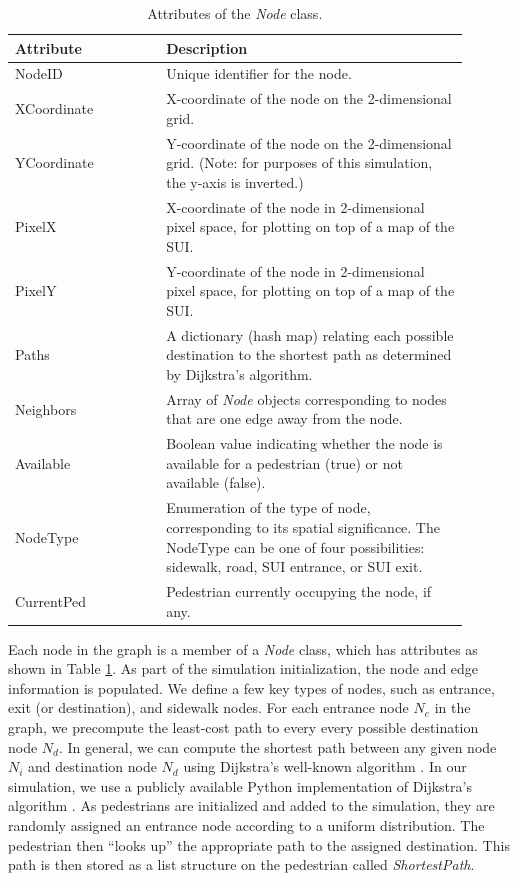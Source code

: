 \documentclass[12pt]{article}
\begin{document}
\def\arraystretch{1.5}
\begin{table}[hb!]
  \centering
    \begin{tabular}{p{0.3\linewidth}p{0.6\linewidth}}
     \hline
     Attribute & Description \\
     \hline
     NodeID      & Unique identifier for the node. \\
     XCoordinate & X-coordinate of the node on the 2-dimensional grid. \\
     YCoordinate & Y-coordinate of the node on the 2-dimensional grid.
                   (Note: for purposes of this simulation, the y-axis is
                    inverted.) \\
     PixelX      & X-coordinate of the node in 2-dimensional pixel space, for
                   plotting on top of a map of the SUI. \\
     PixelY      & Y-coordinate of the node in 2-dimensional pixel space, for
                   plotting on top of a map of the SUI. \\
     Paths       & A dictionary (hash map) relating each possible destination
                   to the shortest path as determined by Dijkstra's algorithm.\\
     Neighbors   & Array of \textit{Node} objects corresponding to nodes that are
                   one edge away from the node. \\
     Available	 & Boolean value indicating whether the node is available for a
                   pedestrian (true) or not available (false). \\
     NodeType    & Enumeration of the type of node, corresponding to its
                   spatial significance. The NodeType can be one of four
                   possibilities: sidewalk, road, SUI entrance, or SUI exit. \\
     CurrentPed & Pedestrian currently occupying the node, if any. \\
     \hline
    \end{tabular}
    \caption{Attributes of the \textit{Node} class.}
  \label{table:node}
\end{table}

Each node in the graph is a member of a \textit{Node} class, which
has attributes as shown in Table \ref{table:node}. As part of the simulation
initialization, the node and edge information is
populated. We define a few key types of nodes, such as entrance, exit (or
destination), and sidewalk nodes. For each entrance node $N_e$ in the graph, we
precompute the least-cost path to every every possible destination node $N_d$.
In general,
we can compute the shortest path between any given node $N_i$ and destination
node $N_d$ using Dijkstra's well-known algorithm \cite{dijkstra1959note}. In our
simulation, we use a publicly available Python implementation of Dijkstra's
algorithm \cite{eppstein-dijkstra}. As pedestrians are initialized and added to
the simulation, they are randomly assigned an entrance node according to a
uniform distribution. The pedestrian then ``looks up'' the appropriate path
to the assigned destination. This path is then stored as a list structure on the
pedestrian called \textit{ShortestPath}.
\end{document}
